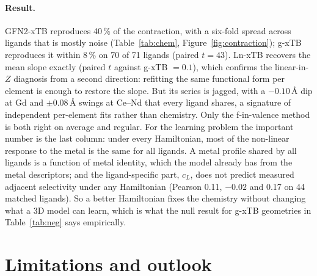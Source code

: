 \documentclass{article}
\begin{document}
\paragraph{Result.}
GFN2-xTB reproduces 40\,\% of the contraction, with a six-fold spread across ligands that is mostly noise (Table~\ref{tab:chem}, Figure~\ref{fig:contraction}); g-xTB reproduces it within 8\,\% on 70 of 71 ligands (paired $t = 43$).
Ln-xTB recovers the mean slope exactly (paired $t$ against g-xTB $= 0.1$), which confirms the linear-in-$Z$ diagnosis from a second direction: refitting the same functional form per element is enough to restore the slope.
But its series is jagged, with a $-0.10$\,\AA{} dip at Gd and $\pm 0.08$\,\AA{} swings at Ce--Nd that every ligand shares, a signature of independent per-element fits rather than chemistry.
Only the f-in-valence method is both right on average and regular.
For the learning problem the important number is the last column: under every Hamiltonian, most of the non-linear response to the metal is the same for all ligands.
A metal profile shared by all ligands is a function of metal identity, which the model already has from the metal descriptors; and the ligand-specific part, $c_L$, does not predict measured adjacent selectivity under any Hamiltonian (Pearson 0.11, $-0.02$ and 0.17 on 44 matched ligands).
So a better Hamiltonian fixes the chemistry without changing what a 3D model can learn, which is what the null result for g-xTB geometries in Table~\ref{tab:neg} says empirically.

\section{Limitations and outlook}
\end{document}
